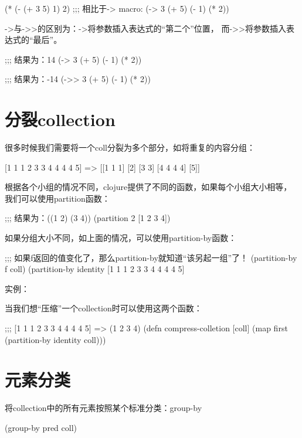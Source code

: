 \documentclass[a4paper,11pt]{article}
\begin{document}
  \begin{schemecode}
(* (- (+ 3 5) 1) 2)
;;; 相比于-> macro:
(-> 3 (+ 5) (- 1) (* 2))
  \end{schemecode}

  ->与->>的区别为：->将参数插入表达式的“第二个”位置，
  而->>将参数插入表达式的“最后”。

  \begin{schemecode}
;;; 结果为：14
(-> 3 (+ 5) (- 1) (* 2))

;;; 结果为：-14
(->> 3 (+ 5) (- 1) (* 2))
  \end{schemecode}


  \section[分裂collection]{分裂collection}
  很多时候我们需要将一个coll分裂为多个部分，如将重复的内容分组：

  [1 1 1 2 3 3 4 4 4 4 5] => [[1 1 1] [2] [3 3] [4 4 4 4] [5]]

  根据各个小组的情况不同，clojure提供了不同的函数，如果每个小组大小相等，
  我们可以使用partition函数：

  \begin{schemecode}
;;; 结果为：((1 2) (3 4))
(partition 2 [1 2 3 4])
  \end{schemecode}

  如果分组大小不同，如上面的情况，可以使用partition-by函数：

  \begin{schemecode}
;;; 如果f返回的值变化了，那么partition-by就知道“该另起一组”了！
(partition-by f coll)
(partition-by identity [1 1 1 2 3 3 4 4 4 4 5]
  \end{schemecode}

  实例：\par
  当我们想“压缩”一个collection时可以使用这两个函数：

  \begin{schemecode}
;;; [1 1 1 2 3 3 4 4 4 4 5] => (1 2 3 4)
(defn compress-colletion
  [coll]
  (map first (partition-by identity coll)))
  \end{schemecode}


  \section[元素分类]{元素分类}
  将collection中的所有元素按照某个标准分类：group-by

  \begin{schemecode}
(group-by pred coll)
  \end{schemecode}
\end{document}
